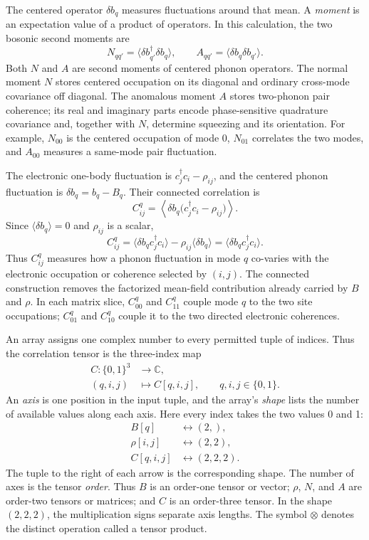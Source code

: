 \documentclass[10pt,letterpaper,twocolumn]{article}
\newcommand{\C}{\mathbb C}
\begin{document}
The centered operator \(\delta b_q\) measures fluctuations around that mean.
A \emph{moment} is an expectation value of a product of operators.  In this
calculation, the two bosonic second moments are
\[
N_{qq'}=\langle\delta b_{q'}^\dagger\delta b_q\rangle,
\qquad
A_{qq'}=\langle\delta b_q\delta b_{q'}\rangle.
\tag{2}
\]
Both \(N\) and \(A\) are second moments of centered phonon operators.
The normal moment \(N\) stores centered occupation on its diagonal and
ordinary cross-mode covariance off diagonal.  The anomalous moment \(A\)
stores two-phonon pair coherence; its real and imaginary parts encode
phase-sensitive quadrature covariance and, together with \(N\), determine
squeezing and its orientation.  For example, \(N_{00}\) is the
centered occupation of mode 0, \(N_{01}\) correlates the two modes, and
\(A_{00}\) measures a same-mode pair fluctuation.

The electronic one-body fluctuation is
\(c_j^\dagger c_i-\rho_{ij}\), and the centered phonon fluctuation is
\(\delta b_q=b_q-B_q\).  Their connected correlation is
\[
C^q_{ij}
=\left\langle
\delta b_q\bigl(c_j^\dagger c_i-\rho_{ij}\bigr)
\right\rangle.
\]
Since \(\langle\delta b_q\rangle=0\) and \(\rho_{ij}\) is a scalar,
\[
C^q_{ij}
=\langle\delta b_q c_j^\dagger c_i\rangle
-\rho_{ij}\langle\delta b_q\rangle
=\langle\delta b_q c_j^\dagger c_i\rangle.
\]
Thus \(C^q_{ij}\) measures how a phonon fluctuation in mode \(q\) co-varies with the
electronic occupation or coherence selected by \((i,j)\).  The connected
construction removes the factorized mean-field contribution already carried
by \(B\) and \(\rho\).  In each matrix slice, \(C^q_{00}\) and \(C^q_{11}\)
couple mode \(q\) to the two site occupations; \(C^q_{01}\) and
\(C^q_{10}\) couple it to the two directed electronic coherences.

An array assigns one complex number to every permitted tuple of indices.  Thus
the correlation tensor is the three-index map
\[
\begin{aligned}
C:\{0,1\}^3&\longrightarrow\C,\\
(q,i,j)&\longmapsto C[q,i,j],
\qquad q,i,j\in\{0,1\}.
\end{aligned}
\]
An \emph{axis} is one position in the input tuple, and the array's
\emph{shape} lists the number of available values along each axis.  Here every
index takes the two values 0 and 1:
\[
\begin{aligned}
B[q]&\longleftrightarrow(2,),\\
\rho[i,j]&\longleftrightarrow(2,2),\\
C[q,i,j]&\longleftrightarrow(2,2,2).
\end{aligned}
\]
The tuple to the right of each arrow is the corresponding shape.
The number of axes is the tensor \emph{order}.  Thus \(B\) is an order-one
tensor or vector; \(\rho\), \(N\), and \(A\) are order-two tensors or
matrices; and \(C\) is an order-three tensor.  In the shape
\((2,2,2)\), the multiplication signs separate axis lengths.  The symbol
\(\otimes\) denotes the distinct operation called a tensor product.
\end{document}

